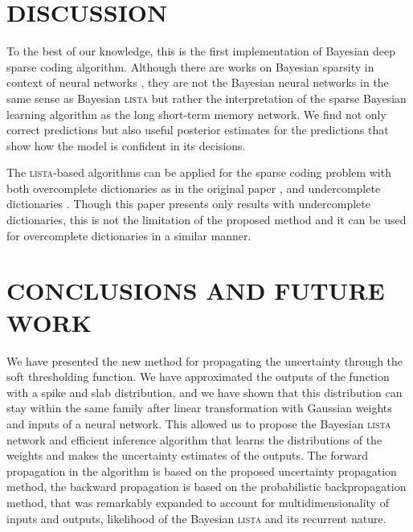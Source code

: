 \documentclass[letterpaper]{article}
\begin{document}
\section{\uppercase{Discussion}}
\label{sec:discussion}
To the best of our knowledge, this is the first implementation of Bayesian deep sparse coding algorithm. Although there are works on Bayesian sparsity in context of neural networks \citep{he2017bayesian}, they are not the Bayesian neural networks in the same sense as Bayesian \textsc{lista} but rather the interpretation of the sparse Bayesian  learning algorithm as the long short-term memory network. We find not only correct predictions but also useful posterior estimates for the predictions that show how the model is confident in its decisions.


The \textsc{lista}-based algorithms can be applied for the sparse coding problem with both overcomplete dictionaries as in the original paper \citep{gregor2010learning}, and undercomplete dictionaries \citep{borgerding2017amp}. Though this paper presents only results with undercomplete dictionaries, this is not the limitation of the proposed method and it can be used for overcomplete dictionaries in a similar manner.

\section{\uppercase{Conclusions and future work}}
\label{sec:conclusions}
We have presented the new method for propagating the uncertainty through the soft thresholding function. %
We have approximated the outputs of the function with a spike and slab distribution, and we have shown that this distribution can stay within the same family after linear transformation with Gaussian weights and inputs of a neural network. This allowed us to propose the Bayesian \textsc{lista} network and efficient inference algorithm that learns the distributions of the weights and makes the uncertainty estimates of the outputs. The forward propagation in the algorithm is based on the proposed uncertainty propagation method, the backward propagation is based on the probabilistic backpropagation method, that was remarkably expanded to account for multidimensionality of inputs and outputs, likelihood of the Bayesian \textsc{lista} and its recurrent nature.
\end{document}
